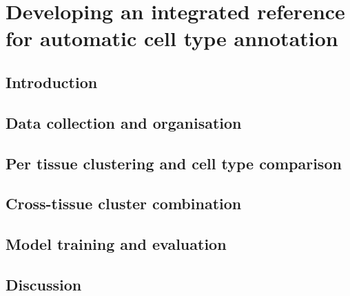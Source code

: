 \chapter{Developing an integrated reference for automatic cell type annotation} \label{chap:CT_method}

\ifpdf
    \graphicspath{{Chapter3/Figs/Raster/}{Chapter3/Figs/PDF/}{Chapter3/Figs/}}
\else
    \graphicspath{{Chapter3/Figs/Vector/}{Chapter3/Figs/}}
\fi



\section{Introduction}
\label{section3.1}



\section{Data collection and organisation}
\label{section3.2}



\section{Per tissue clustering and cell type comparison}
\label{section3.3}



\section{Cross-tissue cluster combination}
\label{section3.4}



\section{Model training and evaluation}
\label{section3.5}



\section{Discussion}
\label{section3.6}